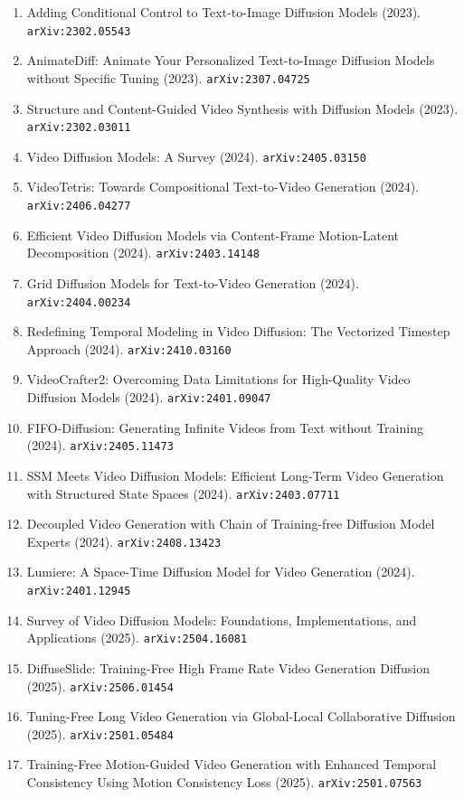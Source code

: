 \documentclass[11pt]{article}
\begin{document}
\begin{enumerate}
  \item Adding Conditional Control to Text-to-Image Diffusion Models (2023). \texttt{arXiv:2302.05543}
  \item AnimateDiff: Animate Your Personalized Text-to-Image Diffusion Models
  without Specific Tuning (2023). \texttt{arXiv:2307.04725}
  \item Structure and Content-Guided Video Synthesis with Diffusion Models (2023). \texttt{arXiv:2302.03011}
  \item Video Diffusion Models: A Survey (2024). \texttt{arXiv:2405.03150}
  \item VideoTetris: Towards Compositional Text-to-Video Generation (2024). \texttt{arXiv:2406.04277}
  \item Efficient Video Diffusion Models via Content-Frame Motion-Latent
  Decomposition (2024). \texttt{arXiv:2403.14148}
  \item Grid Diffusion Models for Text-to-Video Generation (2024). \texttt{arXiv:2404.00234}
  \item Redefining Temporal Modeling in Video Diffusion: The Vectorized Timestep
  Approach (2024). \texttt{arXiv:2410.03160}
  \item VideoCrafter2: Overcoming Data Limitations for High-Quality Video
  Diffusion Models (2024). \texttt{arXiv:2401.09047}
  \item FIFO-Diffusion: Generating Infinite Videos from Text without Training (2024). \texttt{arXiv:2405.11473}
  \item SSM Meets Video Diffusion Models: Efficient Long-Term Video Generation
  with Structured State Spaces (2024). \texttt{arXiv:2403.07711}
  \item Decoupled Video Generation with Chain of Training-free Diffusion Model
  Experts (2024). \texttt{arXiv:2408.13423}
  \item Lumiere: A Space-Time Diffusion Model for Video Generation (2024). \texttt{arXiv:2401.12945}
  \item Survey of Video Diffusion Models: Foundations, Implementations, and Applications (2025). \texttt{arXiv:2504.16081}
  \item DiffuseSlide: Training-Free High Frame Rate Video Generation Diffusion (2025). \texttt{arXiv:2506.01454}
  \item Tuning-Free Long Video Generation via Global-Local Collaborative
  Diffusion (2025). \texttt{arXiv:2501.05484}
  \item Training-Free Motion-Guided Video Generation with Enhanced Temporal
  Consistency Using Motion Consistency Loss (2025). \texttt{arXiv:2501.07563}

\end{enumerate}
\end{document}

